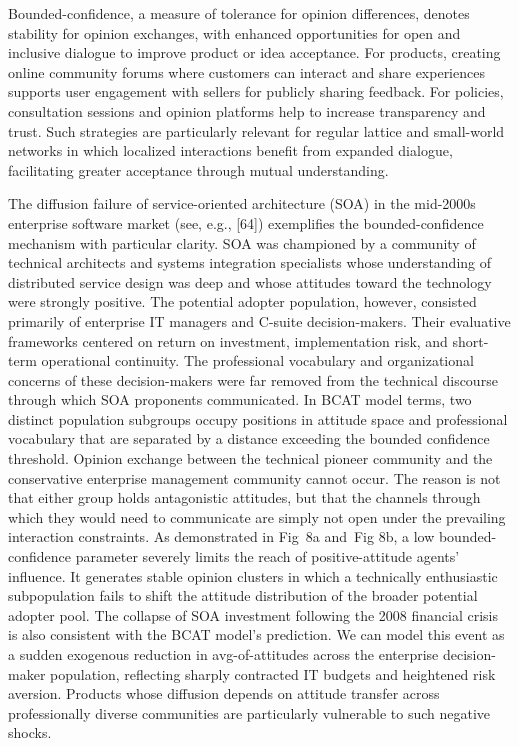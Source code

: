 \documentclass[10pt,letterpaper]{article}
\begin{document}
Bounded-confidence, a measure of tolerance for opinion differences, denotes stability for opinion exchanges, with enhanced opportunities for open and inclusive dialogue to improve product or idea acceptance. For products, creating online community forums where customers can interact and share experiences supports user engagement with sellers for publicly sharing feedback. For policies, consultation sessions and opinion platforms help to increase transparency and trust. Such strategies are particularly relevant for regular lattice and small-world networks in which localized interactions benefit from expanded dialogue, facilitating greater acceptance through mutual understanding.

The diffusion failure of service-oriented architecture (SOA) in the mid-2000s enterprise software market (see, e.g., [64]) exemplifies the bounded-confidence mechanism with particular clarity. SOA was championed by a community of technical architects and systems integration specialists whose understanding of distributed service design was deep and whose attitudes toward the technology were strongly positive. The potential adopter population, however, consisted primarily of enterprise IT managers and C-suite decision-makers. Their evaluative frameworks centered on return on investment, implementation risk, and short-term operational continuity. The professional vocabulary and organizational concerns of these decision-makers were far removed from the technical discourse through which SOA proponents communicated. In BCAT model terms, two distinct population subgroups occupy positions in attitude space and professional vocabulary that are separated by a distance exceeding the bounded confidence threshold. Opinion exchange between the technical pioneer community and the conservative enterprise management community cannot occur. The reason is not that either group holds antagonistic attitudes, but that the channels through which they would need to communicate are simply not open under the prevailing interaction constraints. As demonstrated in Fig~8a and~Fig 8b, a low bounded-confidence parameter severely limits the reach of positive-attitude agents' influence. It generates stable opinion clusters in which a technically enthusiastic subpopulation fails to shift the attitude distribution of the broader potential adopter pool. The collapse of SOA investment following the 2008 financial crisis is also consistent with the BCAT model's prediction. We can model this event as a sudden exogenous reduction in avg-of-attitudes across the enterprise decision-maker population, reflecting sharply contracted IT budgets and heightened risk aversion. Products whose diffusion depends on attitude transfer across professionally diverse communities are particularly vulnerable to such negative shocks.
\end{document}
